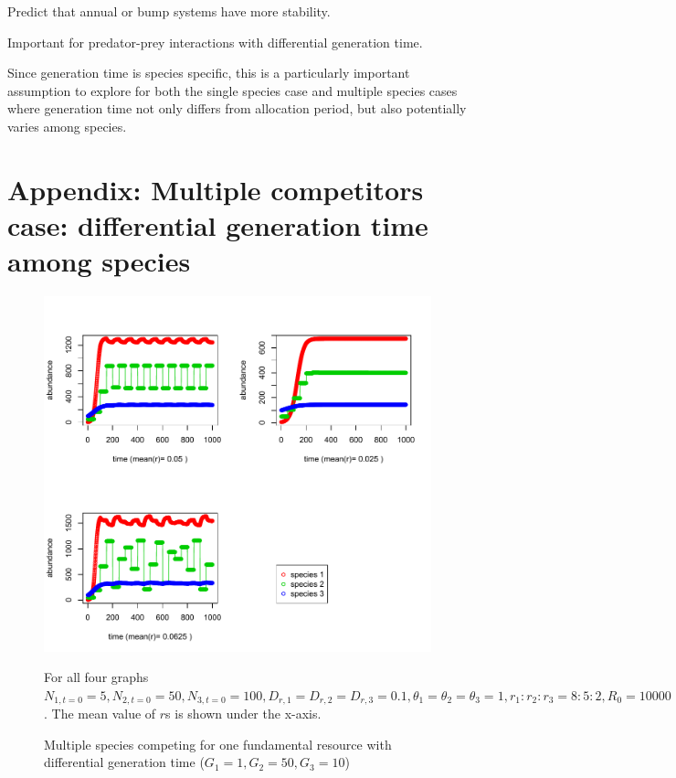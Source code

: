 \documentclass[12pt]{article}
\begin{document}
Predict that annual or bump systems have more stability.

Important for predator-prey interactions with differential generation time.

Since generation time is species specific, this is a particularly important assumption to explore for both the single species case and multiple species cases where generation time not only differs from allocation period, but also potentially varies among species.


\section{Appendix: Multiple competitors case: differential generation time among species}
\begin{figure}
 \includegraphics[width=\textwidth]{oscillation_r_effect.pdf}
 \caption{Multiple species competing for one fundamental resource with differential generation time ($G_1=1, G_2=50, G_3=10$)}
For all four graphs $ N_{1,t=0}=5, N_{2,t=0}=50,N_{3,t=0}=100, D_{r,1}=D_{r,2}=D_{r,3}=0.1, \theta_1=\theta_2=\theta_3=1, r_1: r_2:r_3= 8:5:2, R_0=10000$. The mean value of $r$s is shown under the x-axis.
\end{figure}
\end{document}
